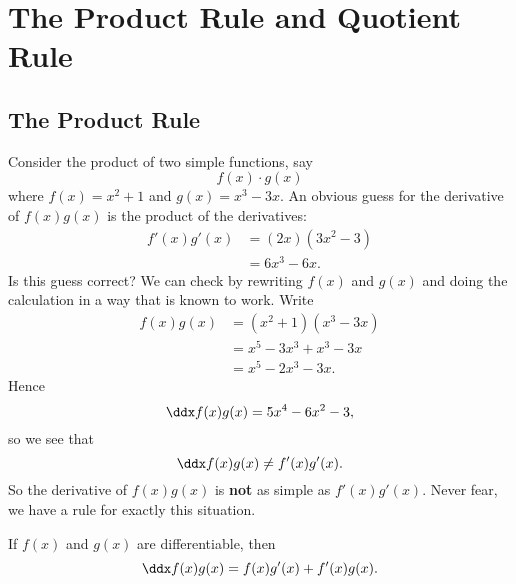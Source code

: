 \chapter{The Product Rule and Quotient Rule}

\section{The Product Rule}

Consider the product of two simple functions, say
\[
f(x)\cdot g(x)
\]
where $f(x)=x^2+1$ and $g(x)=x^3-3x$. An obvious guess for the
derivative of $f(x)g(x)$ is the product of the derivatives:
\begin{align*}
f'(x)g'(x) &= (2x)(3x^2-3)\\
&= 6x^3-6x.
\end{align*}
Is this guess correct? We can check by rewriting $f(x)$
and $g(x)$ and doing the calculation in a way that is known to
work. Write 
\begin{align*}
f(x)g(x) &= (x^2+1)(x^3-3x)\\
&=x^5-3x^3+x^3-3x\\
&=x^5-2x^3-3x.
\end{align*} 
Hence
\[
\ddx f(x) g(x) = 5x^4-6x^2-3, 
\]
so we see that 
\[
\ddx f(x) g(x) \ne  f'(x)g'(x).
\]
So the derivative of $f(x)g(x)$ is \textbf{not} as simple as
$f'(x)g'(x)$. Never fear, we have a rule for exactly this
situation.
\begin{mainTheorem}\label{theorem:product-rule}
If $f(x)$ and $g(x)$ are differentiable, then
\[
\ddx f(x)g(x) = f(x)g'(x)+f'(x)g(x).
\]
\end{mainTheorem}

